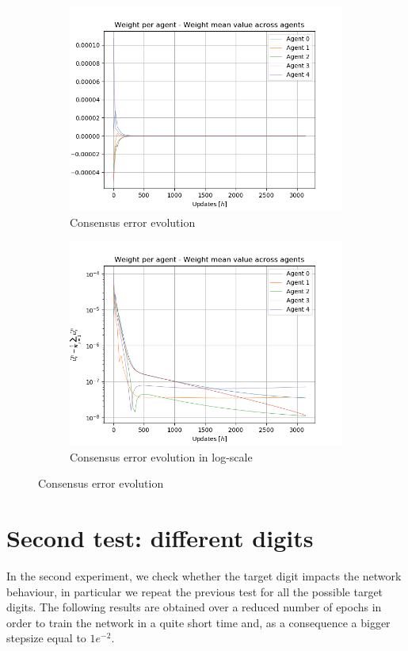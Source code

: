 \documentclass[a4paper,11pt,oneside]{book}
\begin{document}
\begin{figure}[h]
\centering
	\begin{subfigure}{0.49\textwidth}	
	\includegraphics[width=\textwidth]{cycle/weight_100}
	\caption{Consensus error evolution}
	\end{subfigure}
\hfill
	\begin{subfigure}{0.49\textwidth}	
	\includegraphics[width=\textwidth]{cycle/weight_100_log}
	\caption{Consensus error evolution in log-scale}
	\end{subfigure}
\caption{Consensus error evolution}
\label{cycle_consensus}
\end{figure}

\section{Second test: different digits}
In the second experiment, we check whether the target digit impacts the network behaviour, in particular we repeat the previous test for all the possible target digits. The following results are obtained over a reduced number of epochs in order to train the network in a quite short time and, as a consequence a bigger stepsize equal to $1e^{-2}$.
\end{document}
